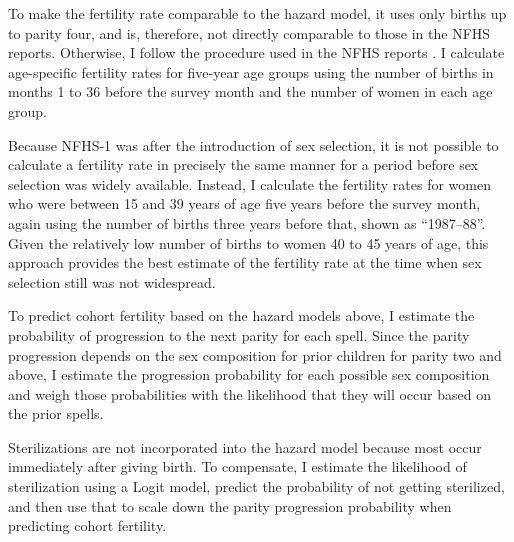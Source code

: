 \documentclass[12pt,letterpaper]{article}
\begin{document}


To make the fertility rate comparable to the hazard model, it uses only births up to 
parity four, and is, therefore, not directly comparable to those in the NFHS reports.
Otherwise, I follow the procedure used in the NFHS reports \citep{Croft2018}.
I calculate age-specific fertility rates for five-year age groups using the number of 
births in months 1 to 36 before the survey month and the number of women in each age 
group.

%

Because NFHS-1 was after the introduction of sex selection, it is not possible 
to calculate a fertility rate in precisely the same manner for a period 
before sex selection was widely available.
Instead, I calculate the fertility rates for women who were between 15 and 39 years of
age five years before the survey month, again using the number of births three years 
before that, shown as ``1987--88''.
Given the relatively low number of births to women 40 to 45 years of age, this approach 
provides the best estimate of the fertility rate at the time when sex selection still was 
not widespread.

To predict cohort fertility based on the hazard models above, I estimate the probability 
of progression to the next parity for each spell.
Since the parity progression depends on the sex composition for prior children for parity 
two and above, I estimate the progression probability for each possible sex composition
and weigh those probabilities with the likelihood that they will occur based on the
prior spells.

Sterilizations are not incorporated into the hazard model because most occur
immediately after giving birth. 
To compensate, I estimate the likelihood of sterilization using a Logit model, predict 
the probability of not getting sterilized, and then use that to scale down the parity
progression probability when predicting cohort fertility.
\end{document}
